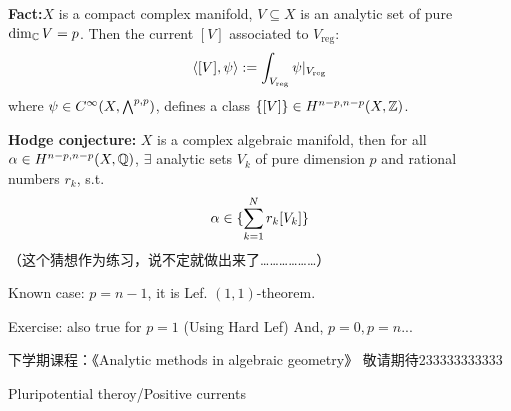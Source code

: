 \textbf{Fact:}$X$ is a compact complex manifold,
$V\subseteq X$ is an analytic set of pure 
$\dim_{\mathbb{C}}V=p$. Then the current $[V]$ associated
to $V_{\text{reg}}$:
$$
  \langle [V],\psi \rangle
:=
  \int_{V_{\text{reg}}}
    \psi|_{V_{\text{reg}}}
$$  
where $\psi\in C^\infty(X,\bigwedge\nolimits^{p,p})$,
defines a class 
$\{[V]\}\in H^{n-p,n-p}(X,\mathbb{Z})$.

\textbf{Hodge conjecture:} $X$ is a complex algebraic manifold,
then for all $\alpha\in H^{n-p,n-p}(X,\mathbb{Q})$,
$\exists$ analytic sets $V_k$ of pure dimension $p$ and
rational numbers $r_k$, s.t.
$$
  \alpha\in
  \{\sum_{k=1}^Nr_k[V_k]\}
$$
（这个猜想作为练习，说不定就做出来了………………）

Known case: $p=n-1$, it is Lef. $(1,1)$-theorem.

Exercise: also true for $p=1$ (Using Hard Lef)
And, $p=0,p=n$...\vspp 

下学期课程：《Analytic methods in algebraic geometry》
敬请期待233333333333

Pluripotential theroy/Positive currents


